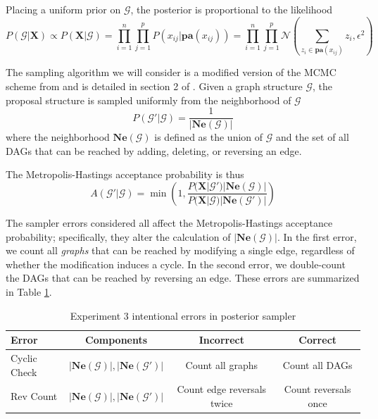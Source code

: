 \documentclass[a4paper,11pt]{article}
\begin{document}
Placing a uniform prior on $\mathcal{G}$, the posterior is proportional to the likelihood
\begin{equation}
    P(\mathcal{G}|\mathbf{X}) \propto P(\mathbf{X}|\mathcal{G}) = \prod_{i=1}^{n} \prod_{j=1}^{p} P(x_{ij}|\mathbf{pa}(x_{ij})) = \prod_{i=1}^{n} \prod_{j=1}^{p}
    \mathcal{N}(\sum_{z_{i} \in \mathbf{pa}(x_{ij})} z_{i}, \epsilon^2)
\end{equation}

The sampling algorithm we will consider is a modified version of the MCMC scheme from \cite{madigan_bayesian_1995} and is detailed in section 2 of \cite{grzegorczyk_improving_2008}. Given a graph structure $\mathcal{G}$, the proposal structure is sampled uniformly from the neighborhood of $\mathcal{G}$
\begin{equation}
P(\mathcal{G}' | \mathcal{G}) = \frac{1}{|\mathbf{Ne}(\mathcal{G})|}
\end{equation}
where the neighborhood $\mathbf{Ne}(\mathcal{G})$ is defined as the union of $\mathcal{G}$ and the set of all DAGs that can be reached by adding, deleting, or reversing an edge.

The Metropolis-Hastings acceptance probability is thus
\begin{equation}
A(\mathcal{G}'|\mathcal{G}) = \min{\left(1,\frac{P(\mathbf{X}|\mathcal{G}')|\mathbf{Ne}(\mathcal{G})|}{P(\mathbf{X}|\mathcal{G})|\mathbf{Ne}(\mathcal{G}')|}\right)}
\end{equation}

The sampler errors considered all affect the Metropolis-Hastings acceptance probability; specifically, they alter the calculation of $|\mathbf{Ne}(\mathcal{G})|$. In the first error, we count all \textit{graphs} that can be reached by modifying a single edge, regardless of whether the modification induces a cycle. In the second error, we double-count the DAGs that can be reached by reversing an edge. These errors are summarized in Table \ref{tab:ex3_errors}.

\begin{table}
    \centering
    \begin{tabular}{l|c|c|c}
          Error & Components & Incorrect & Correct \\
         \hline
         Cyclic Check & $|\mathbf{Ne}(\mathcal{G})|, |\mathbf{Ne}(\mathcal{G}')|$ & Count all graphs & Count all DAGs \\
         Rev Count & $|\mathbf{Ne}(\mathcal{G})|, |\mathbf{Ne}(\mathcal{G}')|$ & Count edge reversals twice & Count reversals once \\
    \end{tabular}
    \caption{Experiment 3 intentional errors in posterior sampler}
    \label{tab:ex3_errors}
\end{table}
\end{document}
